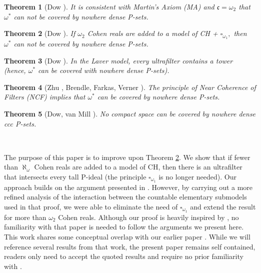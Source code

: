 \documentclass{article}%
\newtheorem{theorem}{Theorem}
\begin{document}
\begin{theorem}
[Dow \cite{CozeroAccesiblePoints}]It is consistent with \emph{Martin's Axiom
(MA) }and $\mathfrak{c}=\omega_{2}$ that $\omega^{\ast}$ can not be covered by
nowhere dense \textsf{P}-sets.
\end{theorem}

\begin{theorem}
[Dow \cite{PFiltersCohenRandomLaver}]If $\omega_{2}$ Cohen reals are added to
a model of \textsf{CH + }$\square_{\omega_{1}},$ then $\omega^{\ast}$ can not
be covered by nowhere dense \textsf{P}-sets. \label{Alan Cohen}
\end{theorem}

\begin{theorem}
[Dow \cite{PFiltersCohenRandomLaver}]In the Laver model, every ultrafilter
contains a tower (hence, $\omega^{\ast}$ can be covered with nowhere dense
\textsf{P}-sets).
\end{theorem}

\begin{theorem}
[Zhu \cite{RemarkonNowheredensePsets}, Brendle, Farkas, Verner
\cite{TowersinFilters}]The principle of \emph{Near Coherence of Filters
(}\textsf{NCF}\emph{)} implies that $\omega^{\ast}$ can be covered by nowhere
dense \textsf{P}-sets.
\end{theorem}

\begin{theorem}
[Dow, van Mill \cite{NowhereDenseCCCPSets}]No compact space can be covered by
nowhere dense ccc \textsf{P}-sets.
\end{theorem}

\qquad\ \qquad\ \ 

The purpose of this paper is to improve upon Theorem \ref{Alan Cohen}. We show
that if fewer than $\aleph_{\omega}$ Cohen reals are added to a model of
\textsf{CH, }then there is an ultrafilter that intersects every tall
\textsf{P}-ideal (the principle $\square_{\omega_{1}}$ is no longer needed).
Our approach builds on the argument presented in
\cite{PFiltersCohenRandomLaver}. However, by carrying out a more refined
analysis of the interaction between the countable elementary submodels used in
that proof, we were able to eliminate the need of $\square_{\omega_{1}}$ and
extend the result for more than $\omega_{2}$ Cohen reals. Although our proof
is heavily inspired by \cite{PFiltersCohenRandomLaver}, no familiarity with
that paper is needed to follow the arguments we present here. This work shares
some conceptual overlap with our earlier paper
\cite{UltrafiltersinRandomModel}. While we will reference several results from
that work, the present paper remains self contained, readers only need to
accept the quoted results and require no prior familiarity with
\cite{UltrafiltersinRandomModel}.
\end{document}
